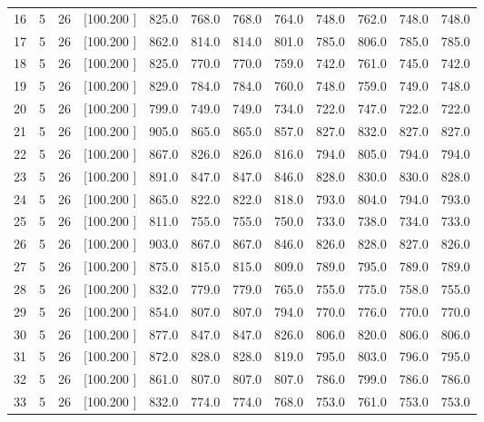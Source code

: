 \documentclass[12pt,a4paper]{article}
\begin{document}
\begin{center}
{\begin{tabular}{r r r r r r r r r r r r}
  16&  5& 26&[100.200   ]&   825.0&   768.0&   768.0&   764.0&   748.0&   762.0&   748.0&   748.0\\[-0.02in]
  17&  5& 26&[100.200   ]&   862.0&   814.0&   814.0&   801.0&   785.0&   806.0&   785.0&   785.0\\[-0.02in]
  18&  5& 26&[100.200   ]&   825.0&   770.0&   770.0&   759.0&   742.0&   761.0&   745.0&   742.0\\[-0.02in]
  19&  5& 26&[100.200   ]&   829.0&   784.0&   784.0&   760.0&   748.0&   759.0&   749.0&   748.0\\[-0.02in]
  20&  5& 26&[100.200   ]&   799.0&   749.0&   749.0&   734.0&   722.0&   747.0&   722.0&   722.0\\[-0.02in]
  21&  5& 26&[100.200   ]&   905.0&   865.0&   865.0&   857.0&   827.0&   832.0&   827.0&   827.0\\[-0.02in]
  22&  5& 26&[100.200   ]&   867.0&   826.0&   826.0&   816.0&   794.0&   805.0&   794.0&   794.0\\[-0.02in]
  23&  5& 26&[100.200   ]&   891.0&   847.0&   847.0&   846.0&   828.0&   830.0&   830.0&   828.0\\[-0.02in]
  24&  5& 26&[100.200   ]&   865.0&   822.0&   822.0&   818.0&   793.0&   804.0&   794.0&   793.0\\[-0.02in]
  25&  5& 26&[100.200   ]&   811.0&   755.0&   755.0&   750.0&   733.0&   738.0&   734.0&   733.0\\[-0.02in]
  26&  5& 26&[100.200   ]&   903.0&   867.0&   867.0&   846.0&   826.0&   828.0&   827.0&   826.0\\[-0.02in]
  27&  5& 26&[100.200   ]&   875.0&   815.0&   815.0&   809.0&   789.0&   795.0&   789.0&   789.0\\[-0.02in]
  28&  5& 26&[100.200   ]&   832.0&   779.0&   779.0&   765.0&   755.0&   775.0&   758.0&   755.0\\[-0.02in]
  29&  5& 26&[100.200   ]&   854.0&   807.0&   807.0&   794.0&   770.0&   776.0&   770.0&   770.0\\[-0.02in]
  30&  5& 26&[100.200   ]&   877.0&   847.0&   847.0&   826.0&   806.0&   820.0&   806.0&   806.0\\[-0.02in]
  31&  5& 26&[100.200   ]&   872.0&   828.0&   828.0&   819.0&   795.0&   803.0&   796.0&   795.0\\[-0.02in]
  32&  5& 26&[100.200   ]&   861.0&   807.0&   807.0&   807.0&   786.0&   799.0&   786.0&   786.0\\[-0.02in]
  33&  5& 26&[100.200   ]&   832.0&   774.0&   774.0&   768.0&   753.0&   761.0&   753.0&   753.0\\[-0.02in]

\end{tabular}}
\end{center}
\end{document}
